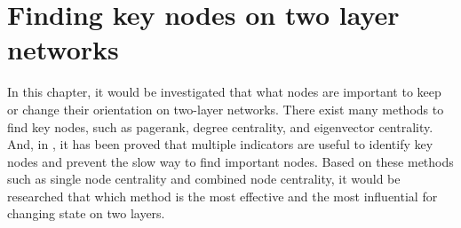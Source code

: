 
\chapter{Finding key nodes on two layer networks}
\label{chap:finding key nodes on two layer networks}
In this chapter, it would be investigated that what nodes are important to keep or change their orientation on two-layer networks. There exist many methods to find key nodes, such as pagerank, degree centrality, and eigenvector centrality. And, in \parencite{mesgari2015, huang2014}, it has been proved that multiple indicators are useful to identify key nodes and prevent the slow way to find important nodes. Based on these methods such as single node centrality and combined node centrality, it would be researched that which method is the most effective and the most influential for changing state on two layers.  

